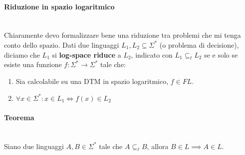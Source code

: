 \documentclass{article}
\begin{document}
\paragraph{Riduzione in spazio logaritmico}\mbox{}\\
Chiaramente devo formalizzare bene una riduzione tra problemi che mi tenga conto dello spazio.
Dati due linguaggi $L_1,L_2\subseteq\Sigma^*$ (o problema di decisione), diciamo che
$L_1$ si \textbf{log-space riduce} a $L_2$, indicato con $L_1\subseteq_{\ell}L_2$ se e solo se
esiste una funzione $f:\Sigma^*\rightarrow\Sigma^*$ tale che:
\begin{enumerate}
    \item Sia calcolabile su una DTM in spazio logaritmico, $f\in FL$.
    \item $\forall x\in\Sigma^*:x\in L_1\Leftrightarrow f(x)\in L_2$
\end{enumerate}
\paragraph{Teorema}\mbox{}\\
Siano due linguaggi $A,B\in\Sigma^*$ tale che $A\subseteq_{\ell}B$, allora $B\in L\implies A\in L$.
\end{document}
